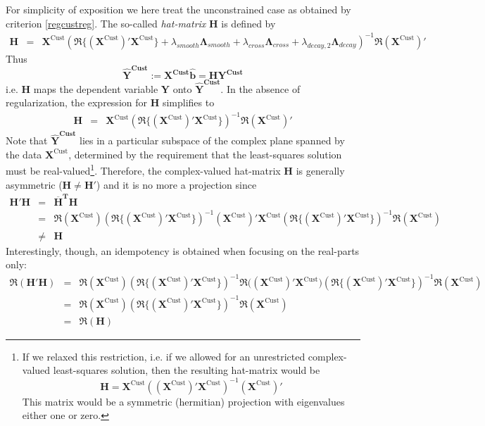 \documentclass[a4paper]{book}
\begin{document}
For simplicity of exposition we here treat the unconstrained case as obtained by criterion \ref{regcustreg}.
The so-called \emph{hat-matrix} $\mathbf{H}$ is defined by 
\begin{eqnarray}
\mathbf{H}&=&\mathbf{X}^{\textrm{Cust}}\left(\Re\big\{(\mathbf{X}^{\textrm{Cust}})' \mathbf{X}^{\textrm{Cust}}\big\}+
\lambda_{{smooth}}\boldsymbol{\Lambda}_{smooth}+\lambda_{{cross}}\boldsymbol{\Lambda}_{cross}+\lambda_{{decay},2}\boldsymbol{\Lambda}_{decay}
\right)^{-1}\Re(\mathbf{X}^{\textrm{Cust}})'\label{hat_matrix_ex}
\end{eqnarray}
Thus
\[\mathbf{\hat{Y}^{\textrm{Cust}}:={X}^{\textrm{Cust}}\hat{b}}=\mathbf{HY^{\textrm{Cust}}}\]
i.e. $\mathbf{H}$ maps the dependent variable $\mathbf{Y}$ onto $\mathbf{\hat{Y}^{\textrm{Cust}}}$. In the absence of regularization, the expression for $\mathbf{H}$ simplifies to
\begin{eqnarray*}
\mathbf{H}&=&\mathbf{X}^{\textrm{Cust}}\left(\Re\big\{(\mathbf{X}^{\textrm{Cust}})' \mathbf{X}^{\textrm{Cust}}\big\}
\right)^{-1}\Re(\mathbf{X}^{\textrm{Cust}})'
\end{eqnarray*}
Note that $\mathbf{\hat{Y}^{\textrm{Cust}}}$  lies in a particular subspace of the complex plane spanned by the data $\mathbf{X}^{\textrm{Cust}}$, determined by the requirement that the least-squares solution must be real-valued\footnote{If we relaxed this restriction, i.e. if we allowed for an unrestricted complex-valued least-squares solution, then the resulting hat-matrix would be
\[\mathbf{H}=\mathbf{X}^{\textrm{Cust}}\left((\mathbf{X}^{\textrm{Cust}})' \mathbf{X}^{\textrm{Cust}}\right)^{-1}(\mathbf{X}^{\textrm{Cust}})'\]
This matrix would be a symmetric (hermitian) projection with eigenvalues either one or zero.}. Therefore, the complex-valued hat-matrix $\mathbf{H}$ is generally asymmetric ($\mathbf{H}\neq \mathbf{H}'$) and it is no more a projection since 
\begin{eqnarray*}
\mathbf{H'H}&=&\mathbf{\overline{H}^TH}\\
&=&\Re(\mathbf{X}^{\textrm{Cust}})\left(\Re\big\{(\mathbf{X}^{\textrm{Cust}})' \mathbf{X}^{\textrm{Cust}}\big\}
\right)^{-1}(\mathbf{X}^{\textrm{Cust}})'\mathbf{X}^{\textrm{Cust}}\left(\Re\big\{(\mathbf{X}^{\textrm{Cust}})' \mathbf{X}^{\textrm{Cust}}\big\}
\right)^{-1}\Re(\mathbf{X}^{\textrm{Cust}})\\
&\neq& \mathbf{H}
\end{eqnarray*}
Interestingly, though, an idempotency is obtained when focusing on the real-parts only:
\begin{eqnarray*}
\Re\left(\mathbf{H'H}\right)&=&\Re(\mathbf{X}^{\textrm{Cust}})\left(\Re\big\{(\mathbf{X}^{\textrm{Cust}})' \mathbf{X}^{\textrm{Cust}}\big\}
\right)^{-1}\Re\Big((\mathbf{X}^{\textrm{Cust}})'\mathbf{X}^{\textrm{Cust}}\Big)\left(\Re\big\{(\mathbf{X}^{\textrm{Cust}})' \mathbf{X}^{\textrm{Cust}}\big\}
\right)^{-1}\Re(\mathbf{X}^{\textrm{Cust}})\\
&=&\Re(\mathbf{X}^{\textrm{Cust}})\left(\Re\big\{(\mathbf{X}^{\textrm{Cust}})' \mathbf{X}^{\textrm{Cust}}\big\}
\right)^{-1}\Re(\mathbf{X}^{\textrm{Cust}}) \\
&=&\Re(\mathbf{H})
\end{eqnarray*}
\end{document}
